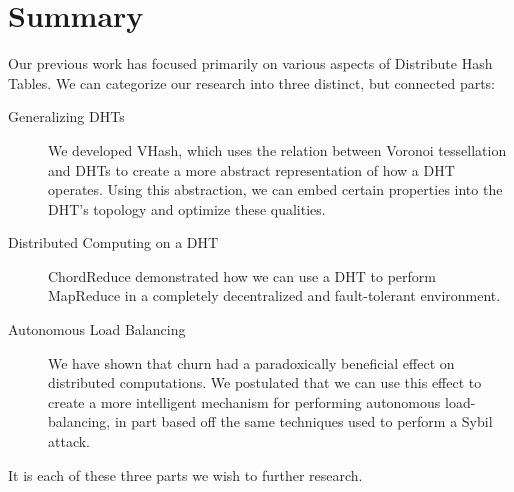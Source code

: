 \section{Summary}
Our previous work has focused primarily on various aspects of Distribute Hash Tables.
We can categorize our research into three distinct, but connected parts:
\begin{description}
	\item[Generalizing DHTs] We developed VHash, which uses the relation between Voronoi tessellation and DHTs to create a more abstract representation of how a DHT operates.
	Using this abstraction, we can embed certain properties into the DHT's topology and optimize these qualities.
	\item[Distributed Computing on a DHT] ChordReduce demonstrated how we can use a DHT to perform MapReduce in a completely decentralized and fault-tolerant environment.
	\item[Autonomous Load Balancing] We have shown that churn had a paradoxically beneficial effect on distributed computations.
	We postulated that we can use this effect to create a more intelligent mechanism for performing autonomous load-balancing, in part based off  the same techniques used to perform a Sybil attack.
	 
\end{description}
It is each of these three parts we wish to further research.